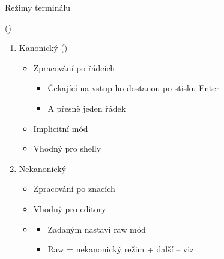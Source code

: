\begin{frame}{Režimy terminálu}

   ()
  \begin{enumerate}
    \item Kanonický ()
    \begin{itemize}
      \item Zpracování po řádcích
      \begin{itemize}
	\item Čekající na vstup ho dostanou po stisku Enter
	\item A přesně jeden řádek
      \end{itemize}

      \pause

      \item Implicitní mód
      \item Vhodný pro shelly
    \end{itemize}

    \pause

    \item Nekanonický
    \begin{itemize}
      \item Zpracování po znacích
      \item Vhodný pro editory

      \pause

      \item {}
      \begin{itemize}
	\item Zadaným  nastaví raw mód
	\item Raw = nekanonický režim + další -- viz 
      \end{itemize}
    \end{itemize}

  \end{enumerate}

\end{frame}

